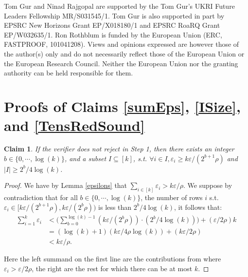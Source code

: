 \documentclass[11pt]{article}
\newtheorem{claim}[theorem]{Claim}
\begin{document}
Tom Gur and Ninad Rajgopal are supported by the Tom Gur's UKRI Future Leaders Fellowship MR/S031545/1. Tom Gur is also supported in part by EPSRC New Horizons Grant EP/X018180/1 and EPSRC RoaRQ Grant EP/W032635/1. Ron Rothblum is funded by the European Union (ERC, FASTPROOF, 101041208). Views and opinions expressed are however those of the author(s) only and do not necessarily reflect those of the European Union or the European Research Council. Neither the European Union nor the granting authority can be held responsible for them.



\appendix

\section{Proofs of Claims \ref{sumEps}, \ref{ISize}, and \ref{TensRedSound}}\label{AppClaimProofs}

\begingroup
\def\thetheorem{\ref{sumEps}}
\begin{claim}
If the verifier does not reject in Step 1, then there exists an integer $b \in \{0,\cdots, \log (k)\}$, and a subset $I \subseteq [k]$, s.t. $\forall i \in I, \varepsilon_{i} \geq k\varepsilon/(2^{b+1}\rho)$ and $\vert I\vert  \geq 2^{b}/4\log (k)$.
\end{claim}
\addtocounter{theorem}{-1}
\endgroup

\begin{proof}
We have by Lemma \ref{epsilons} that $\sum_{i\in [k]}\varepsilon_{i}>k\varepsilon/\rho$. We suppose by contradiction that for all $b\in \{0,\cdots ,\log (k)\}$, the number of rows $i$ s.t. $\varepsilon_{i}\in[k\varepsilon/(2^{b+1}\rho),k\varepsilon /(2^{b}\rho))$ is less than $2^{b}/4\log (k)$, it follows that:
\[
\begin{split}
    \sum_{i=1}^{k}\varepsilon_{i}&<\bigg(\sum_{b=0}^{\log (k) -1}(k\varepsilon/(2^{b}\rho))\cdot (2^{b}/4\log (k))\bigg) +(\varepsilon/2\rho)k\\
    &=(\log (k) +1)(k\varepsilon/4\rho\log (k)) + (k\varepsilon /2\rho)\\
    &<k\varepsilon/\rho.
\end{split}
\]

Here the left summand on the first line are the contributions from where $\varepsilon_{i}>\varepsilon/2\rho$, the right are the rest for which there can be at most $k$.
\end{proof}
\end{document}
